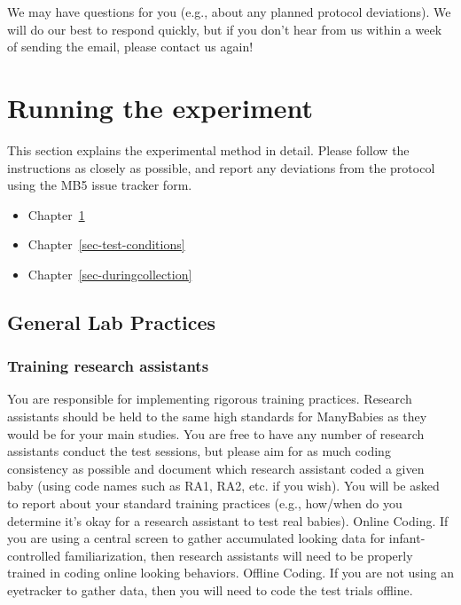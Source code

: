 \documentclass[
  letterpaper,
  DIV=11,
  numbers=noendperiod,
  oneside]{scrreprt}
\providecommand{\tightlist}{%
  \setlength{\itemsep}{0pt}\setlength{\parskip}{0pt}}
\begin{document}
\begin{tcolorbox}[enhanced jigsaw, colbacktitle=quarto-callout-important-color!10!white, coltitle=black, colframe=quarto-callout-important-color-frame, arc=.35mm, colback=white, left=2mm, opacityback=0, opacitybacktitle=0.6, breakable, bottomtitle=1mm, titlerule=0mm, rightrule=.15mm, leftrule=.75mm, toptitle=1mm, title=\textcolor{quarto-callout-important-color}{\faExclamation}\hspace{0.5em}{Wait until you receive an official go-ahead from Project Leads before
you begin testing!}, bottomrule=.15mm, toprule=.15mm]

We may have questions for you (e.g., about any planned protocol
deviations). We will do our best to respond quickly, but if you don't
hear from us within a week of sending the email, please contact us
again!

\end{tcolorbox}

\part{Running the experiment}

This section explains the experimental method in detail. Please follow
the instructions as closely as possible, and report any deviations from
the protocol using the MB5 issue tracker form.

\begin{itemize}
\tightlist
\item
  Chapter~\ref{sec-genlab}
\item
  Chapter~\ref{sec-test-conditions}
\item
  Chapter~\ref{sec-duringcollection}
\end{itemize}

\chapter{General Lab Practices}\label{sec-genlab}

\section{Training research
assistants}\label{training-research-assistants}

You are responsible for implementing rigorous training practices.
Research assistants should be held to the same high standards for
ManyBabies as they would be for your main studies. You are free to have
any number of research assistants conduct the test sessions, but please
aim for as much coding consistency as possible and document which
research assistant coded a given baby (using code names such as RA1,
RA2, etc. if you wish). You will be asked to report about your standard
training practices (e.g., how/when do you determine it's okay for a
research assistant to test real babies). Online Coding. If you are using
a central screen to gather accumulated looking data for
infant-controlled familiarization, then research assistants will need to
be properly trained in coding online looking behaviors. Offline Coding.
If you are not using an eyetracker to gather data, then you will need to
code the test trials offline.
\end{document}
